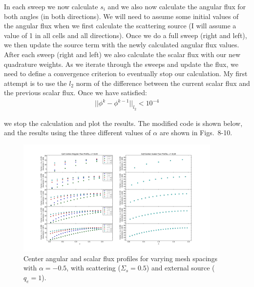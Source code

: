 \documentclass[10pt]{article}
\begin{document}
In each sweep we now calculate $s_i$ and we also now calculate the angular flux for both angles (in both directions). We will need to assume some initial values of the angular flux when we first calculate the scattering source (I will assume a value of 1 in all cells and all directions). Once we do a full sweep (right and left), we then update the source term with the newly calculated angular flux values. After each sweep (right and left) we also calculate the scalar flux with our new quadrature weights. As we iterate through the sweeps and update the flux, we need to define a convergence criterion to eventually stop our calculation. My first attempt is to use the $l_2$ norm of the difference between the current scalar flux and the previous scalar flux. Once we have satisfied:
%
\begin{align*}
    || \phi^k - \phi^{k-1} ||_{l_2} < 10^{-4}
\end{align*}

we stop the calculation and plot the results. The modified code is shown below, and the results using the three different values of $\alpha$ are shown in Figs.~8-10.



\begin{figure}[H]
    \centering
    \includegraphics[width=0.9\textwidth]{Figures/FluxProfile_a=-05_source}
    \caption{Center angular and scalar flux profiles for varying mesh spacings with $\alpha = -0.5$, with scattering ($\Sigma_s = 0.5$) and external source ($q_e=1$).}
    \label{fig8}
\end{figure}
\end{document}
